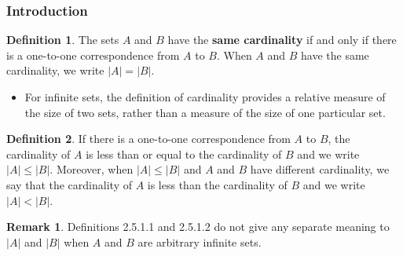 \documentclass[article, 11pt]{article}
\theoremstyle{definition}
\newtheorem*{remark}{Remark}
\newtheorem{definition}{Definition}[subsubsection]
\begin{document}
    \subsubsection{Introduction}
    \begin{definition}
        The sets $A$ and $B$ have the \textbf{same cardinality} if and only if there is a one-to-one correspondence from $A$ to $B$. When $A$ and $B$ have the same cardinality, we write $|A| = |B|$.
        \begin{itemize}
            \item For infinite sets, the definition of cardinality provides a relative measure of the size of two sets, rather than a measure of the size of one particular set. 
        \end{itemize}
    \end{definition}
    \begin{definition}
        If there is a one-to-one correspondence from $A$ to $B$, the cardinality of $A$ is less than or equal to the cardinality of $B$ and we write $|A| \leq |B|$. Moreover, when $|A| \leq |B|$ and $A$ and $B$ have different cardinality, we say that the cardinality of $A$ is less than the cardinality of $B$ and we write $|A| < |B|$.
    \end{definition}
    \begin{remark}
        Definitions 2.5.1.1 and 2.5.1.2 do not give any separate meaning to $|A|$ and $|B|$ when $A$ and $B$ are arbitrary infinite sets.
    \end{remark}
\end{document}
